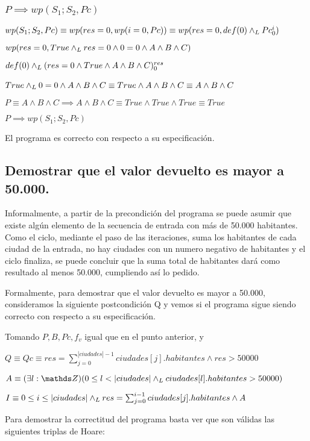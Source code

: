 \documentclass[10pt,a4paper]{article}
\begin{document}
\subsubsection{$P \implies wp(S_{1};S_{2}, Pc)$}
$wp(S_{1};S_{2}, Pc) \equiv wp(res = 0, wp(i = 0, Pc)) \equiv wp(res = 0, def(0) \land _L Pc_{0}^{i})$ \equiv \par
\vspace{5px}
$wp(res = 0, True \land _L res = 0 \wedge 0 = 0 \wedge A \wedge B \wedge C) $ \equiv \par
\vspace{5px}
$def(0) \land _L (res = 0 \wedge True \wedge A \wedge B \wedge C)_{0}^{res} $ \equiv \par
\vspace{5px}
$True \land _L 0 = 0 \wedge A \wedge B \wedge C \equiv True \wedge A \wedge B \wedge C \equiv  A \wedge B \wedge C $ \ \par
\vspace{20px}
$P \equiv A \wedge B \wedge C \implies A \wedge B \wedge C \equiv True \wedge True \wedge True \equiv True$ \par
\vspace{5px}
\begin{center}
    $P \implies wp(S_{1};S_{2}, Pc)$
\end{center}
El programa es correcto con respecto a su especificación.

\subsection{Demostrar que el valor devuelto es mayor a 50.000.}
Informalmente, a partir de la precondición del programa se puede asumir que existe algún elemento de la secuencia de entrada con más de 50.000 habitantes. Como el ciclo, mediante el paso de las iteraciones, suma los habitantes de cada ciudad de la entrada, no hay ciudades con un numero negativo de habitantes y el ciclo finaliza, se puede concluir que la suma total de habitantes dará como resultado al menos 50.000, cumpliendo así lo pedido. \par
Formalmente, para demostrar que el valor devuelto es mayor a 50.000, consideramos la siguiente postcondición Q y vemos si el programa sigue siendo correcto con respecto a su especificación.

Tomando $P, B, Pc, f_{v}$ igual que en el punto anterior, y \\ \par
$Q \equiv Qc \equiv res = \sum_{j=0}^{|ciudades|-1} ciudades[j].habitantes \wedge res > 50000$ \\ \par
$A \equiv (\exists l: \ent)(0 \leq l < |ciudades| \yLuego ciudades[l].habitantes > 50000)$\\ \par
$I \equiv 0 \leq i \leq |ciudades| \land _L res = \sum_{j=0}^{i-1} ciudades[j].habitantes \wedge A$\\ \par
Para demostrar la correctitud del programa basta ver que son válidas las siguientes triplas de Hoare: \par
\vspace{5px}
\end{document}
